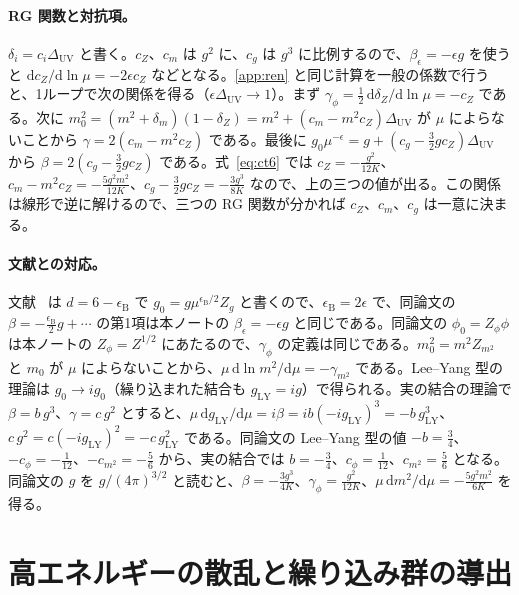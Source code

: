 \documentclass[a4paper,10pt]{ltjsarticle}
\newcommand{\dd}{\mathrm{d}}
\begin{document}
\paragraph{RG 関数と対抗項。}$\delta_i=c_i\Delta_{\mathrm{UV}}$ と書く。$c_Z$、$c_m$ は $g^2$ に、$c_g$ は $g^3$ に比例するので、$\beta_\epsilon=-\epsilon g$ を使うと $\dd c_Z/\dd\ln\mu=-2\epsilon c_Z$ などとなる。\ref{app:ren} と同じ計算を一般の係数で行うと、1ループで次の関係を得る（$\epsilon\Delta_{\mathrm{UV}}\to1$）。まず $\gamma_\phi=\frac12\,\dd\delta_Z/\dd\ln\mu=-c_Z$ である。次に $m_0^2=(m^2+\delta_m)(1-\delta_Z)=m^2+(c_m-m^2c_Z)\Delta_{\mathrm{UV}}$ が $\mu$ によらないことから $\gamma=2(c_m-m^2c_Z)$ である。最後に $g_0\mu^{-\epsilon}=g+(c_g-\frac32gc_Z)\Delta_{\mathrm{UV}}$ から $\beta=2(c_g-\frac32gc_Z)$ である。式~\eqref{eq:ct6} では $c_Z=-\frac{g^2}{12K}$、$c_m-m^2c_Z=-\frac{5g^2m^2}{12K}$、$c_g-\frac32gc_Z=-\frac{3g^3}{8K}$ なので、上の三つの値が出る。この関係は線形で逆に解けるので、三つの RG 関数が分かれば $c_Z$、$c_m$、$c_g$ は一意に決まる。

\paragraph{文献との対応。}文献~\cite{bgks} は $d=6-\epsilon_{\mathrm B}$ で $g_0=g\mu^{\epsilon_{\mathrm B}/2}Z_g$ と書くので、$\epsilon_{\mathrm B}=2\epsilon$ で、同論文の $\beta=-\frac{\epsilon_{\mathrm B}}2g+\cdots$ の第1項は本ノートの $\beta_\epsilon=-\epsilon g$ と同じである。同論文の $\phi_0=Z_\phi\phi$ は本ノートの $Z_\phi=Z^{1/2}$ にあたるので、$\gamma_\phi$ の定義は同じである。$m_0^2=m^2Z_{m^2}$ と $m_0$ が $\mu$ によらないことから、$\mu\,\dd\ln m^2/\dd\mu=-\gamma_{m^2}$ である。Lee--Yang 型の理論は $g_0\to ig_0$（繰り込まれた結合も $g_{\mathrm{LY}}=ig$）で得られる。実の結合の理論で $\beta=b\,g^3$、$\gamma=c\,g^2$ とすると、$\mu\,\dd g_{\mathrm{LY}}/\dd\mu=i\beta=ib(-ig_{\mathrm{LY}})^3=-b\,g_{\mathrm{LY}}^3$、$c\,g^2=c(-ig_{\mathrm{LY}})^2=-c\,g_{\mathrm{LY}}^2$ である。同論文の Lee--Yang 型の値 $-b=\frac34$、$-c_\phi=-\frac1{12}$、$-c_{m^2}=-\frac56$ から、実の結合では $b=-\frac34$、$c_\phi=\frac1{12}$、$c_{m^2}=\frac56$ となる。同論文の $g$ を $g/(4\pi)^{3/2}$ と読むと、$\beta=-\frac{3g^3}{4K}$、$\gamma_\phi=\frac{g^2}{12K}$、$\mu\,\dd m^2/\dd\mu=-\frac{5g^2m^2}{6K}$ を得る。

\section{高エネルギーの散乱と繰り込み群の導出}\label{app:af}
\end{document}
